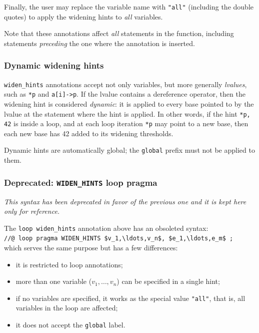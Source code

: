 \documentclass[web]{frama-c-book}
\makeatletter
\newenvironment{important}%
{\hspace{5pt plus \linewidth minus \marginparsep}%
 \begin{lrbox}{\@tempboxa}%
   \begin{minipage}{\linewidth - 2\fboxsep}\itshape}
{\end{minipage}\end{lrbox}\colorbox{gris}{\usebox{\@tempboxa}}}
\makeatother
\begin{document}
Finally, the user may replace the variable name with \lstinline|"all"|
(including the double quotes) to apply the widening hints to {\em all} variables.

Note that these annotations affect {\em all} statements in the function,
including statements {\em preceding} the one where the annotation is inserted.

\subsubsection*{Dynamic widening hints}

\lstinline|widen_hints| annotations accept not only variables, but more
generally \emph{lvalues}, such as \lstinline|*p| and \lstinline|a[i]->p|.
If the lvalue contains a dereference operator, then the widening hint is
considered \emph{dynamic}: it is applied to every base pointed to by the lvalue
at the statement where the hint is applied. In other words, if the hint
\lstinline|*p, 42| is inside a loop, and at each loop iteration \lstinline|*p|
may point to a new base, then each new base has 42 added to its widening
thresholds.

Dynamic hints are automatically global; the \lstinline|global| prefix must not
be applied to them.

\subsubsection*{Deprecated: \texttt{WIDEN\_HINTS} loop pragma}

\begin{important}
  This syntax has been deprecated in favor of the previous one
  and it is kept here only for reference.
\end{important}

The \lstinline|loop widen_hints| annotation above has an obsoleted syntax: \\
\lstinline|//@ loop pragma WIDEN_HINTS $v_1,\ldots,v_n$, $e_1,\ldots,e_m$ ;|\\
which serves the same purpose but has a few differences:

\begin{itemize}
\item it is restricted to loop annotations;
\item more than one variable ($v_1,\ldots,v_n$) can be specified in a single hint;
\item if no variables are specified, it works as the special value \lstinline|"all"|,
  that is, all variables in the loop are affected;
\item it does not accept the \lstinline|global| label.
\end{itemize}
\end{document}
